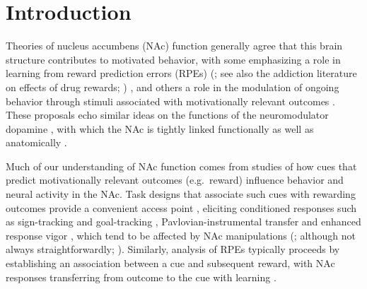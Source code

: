 \documentclass[11pt]{article}
\let\cite=\citep
\let\citeNP=\citealt
\providecommand{\DIFadd}[1]{{\protect\color{red} \sf #1}} %
\providecommand{\DIFdel}[1]{} %
\providecommand{\DIFaddbegin}{} %
\providecommand{\DIFaddend}{} %
\providecommand{\DIFdelbegin}{} %
\providecommand{\DIFdelend}{} %
\newcommand{\DIFscaledelfig}{0.5}
\newlength{\DIFdelgraphicswidth} %
\newlength{\DIFdelgraphicsheight} %
\newcommand{\DIFaddincludegraphics}[2][]{{\color{red}\fbox{\DIFOincludegraphics[#1]{#2}}}} %
\newcommand{\DIFdelincludegraphics}[2][]{%
\sbox{\DIFdelgraphicsbox}{\DIFOincludegraphics[#1]{#2}}%
\settoboxwidth{\DIFdelgraphicswidth}{\DIFdelgraphicsbox} %
\settoboxtotalheight{\DIFdelgraphicsheight}{\DIFdelgraphicsbox} %
\scalebox{\DIFscaledelfig}{%
\parbox[b]{\DIFdelgraphicswidth}{\usebox{\DIFdelgraphicsbox}\\[-\baselineskip] \rule{\DIFdelgraphicswidth}{0em}}\llap{\resizebox{\DIFdelgraphicswidth}{\DIFdelgraphicsheight}{%
\setlength{\unitlength}{\DIFdelgraphicswidth}%
\begin{picture}(1,1)%
\thicklines\linethickness{2pt} %
{\color[rgb]{1,0,0}\put(0,0){\framebox(1,1){}}}%
{\color[rgb]{1,0,0}\put(0,0){\line( 1,1){1}}}%
{\color[rgb]{1,0,0}\put(0,1){\line(1,-1){1}}}%
\end{picture}%
}\hspace*{3pt}}} %
} %
\DeclareRobustCommand{\DIFaddbegin}{\DIFOaddbegin \let\includegraphics\DIFaddincludegraphics} %
\DeclareRobustCommand{\DIFaddend}{\DIFOaddend \let\includegraphics\DIFOincludegraphics} %
\DeclareRobustCommand{\DIFdelbegin}{\DIFOdelbegin \let\includegraphics\DIFdelincludegraphics} %
\DeclareRobustCommand{\DIFdelend}{\DIFOaddend \let\includegraphics\DIFOincludegraphics} %
\begin{document}
\newpage

\section*{Introduction}

Theories of nucleus accumbens (NAc) function generally agree that this
brain structure contributes to motivated behavior, with some
emphasizing a role in learning from reward prediction errors (RPEs)
(\citeNP{Joel2002,Maia2009,Khamassi2012,Lee2012,Schultz2016,Averbeck2017};
see also the addiction literature on effects of drug rewards;
\citeNP{Kalivas2005,Hyman2006,Carelli2009})\DIFaddbegin \DIFadd{, }\DIFaddend and others a role in the
modulation of ongoing behavior through stimuli associated with
motivationally relevant outcomes \cite[invigorating,
  directing;][]{Nicola2010a,Salamone2012,Floresco2015}. These
proposals echo similar ideas on the functions of the neuromodulator
dopamine \cite{Maia2009,Berridge2012,Salamone2012,Schultz2016}, with
which the NAc is tightly linked functionally as well as anatomically
\cite{Cheer2007,Ikemoto2007,DuHoffmann2014,Takahashi2016}.

Much of our understanding of NAc function comes from studies of how
cues that predict motivationally relevant outcomes (e.g.\ reward)
influence behavior and neural activity in the NAc. Task designs that
associate such cues with rewarding outcomes provide a convenient
access point\DIFaddbegin \DIFadd{, }\DIFaddend eliciting conditioned responses such as sign-tracking and
goal-tracking \cite{hearst1974sign,Robinson2009},
\DIFdelbegin \DIFdel{pavlovian-instrumental }\DIFdelend \DIFaddbegin \DIFadd{Pavlovian-instrumental }\DIFaddend transfer \cite{Estes1943,Rescorla1967} and
enhanced response vigor \cite{Niv2007,Nicola2010a}, which tend to be
affected by NAc manipulations
(\citeNP{Corbit2011,Flagel2011,Chang2012}; although not always
straightforwardly; \citeNP{Giertler2004,Chang2013}). Similarly,
analysis of RPEs typically proceeds by establishing an association
between a cue and subsequent reward, with NAc responses transferring
from outcome to the cue with learning
\cite{Schultz1997,Setlow2003,Roitman2005,Day2007a}.
\end{document}
